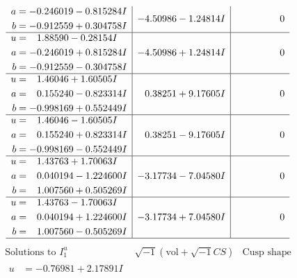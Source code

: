 \documentclass[1p]{elsarticle_modified}
\theoremstyle{definition}
\newcommand{\I}{\sqrt{-1}}
\begin{document}
$$\begin{array}{c|c|c}
\begin{aligned}
a &= -0.246019 - 0.815284 I \\
b &= -0.912559 + 0.304758 I\end{aligned}
 & -4.50986 - 1.24814 I & \phantom{-0.000000 } 0 \\ \hline\begin{aligned}
u &= \phantom{-}1.88590 - 0.28154 I \\
a &= -0.246019 + 0.815284 I \\
b &= -0.912559 - 0.304758 I\end{aligned}
 & -4.50986 + 1.24814 I & \phantom{-0.000000 } 0 \\ \hline\begin{aligned}
u &= \phantom{-}1.46046 + 1.60505 I \\
a &= \phantom{-}0.155240 - 0.823314 I \\
b &= -0.998169 + 0.552449 I\end{aligned}
 & \phantom{-}0.38251 + 9.17605 I & \phantom{-0.000000 } 0 \\ \hline\begin{aligned}
u &= \phantom{-}1.46046 - 1.60505 I \\
a &= \phantom{-}0.155240 + 0.823314 I \\
b &= -0.998169 - 0.552449 I\end{aligned}
 & \phantom{-}0.38251 - 9.17605 I & \phantom{-0.000000 } 0 \\ \hline\begin{aligned}
u &= \phantom{-}1.43763 + 1.70063 I \\
a &= \phantom{-}0.040194 - 1.224600 I \\
b &= \phantom{-}1.007560 + 0.505269 I\end{aligned}
 & -3.17734 - 7.04580 I & \phantom{-0.000000 } 0 \\ \hline\begin{aligned}
u &= \phantom{-}1.43763 - 1.70063 I \\
a &= \phantom{-}0.040194 + 1.224600 I \\
b &= \phantom{-}1.007560 - 0.505269 I\end{aligned}
 & -3.17734 + 7.04580 I & \phantom{-0.000000 } 0\\
 \hline 
 \end{array}$$\newpage$$\begin{array}{c|c|c}  
\text{Solutions to }I^u_{1}& \I (\text{vol} + \sqrt{-1}CS) & \text{Cusp shape}\\
 \hline 
\begin{aligned}
u &= -0.76981 + 2.17891 I \\

\end{aligned}
\end{array}$$
\end{document}
